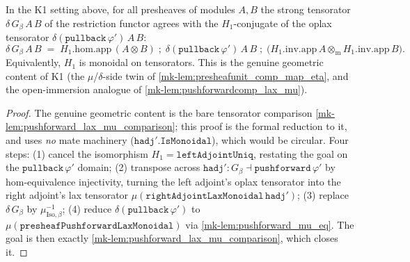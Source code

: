 \begin{lemma}\label{mk-lem:pushforward_mu_appiso_collapse}
  \leanok

  In the K1 setting above, for all presheaves of modules \(A, B\) the strong tensorator
  \(\delta\,G_\beta\,A\,B\) of the restriction functor agrees with the \(H_1\)-conjugate of the
  oplax tensorator \(\delta(\mathtt{pullback}\,\varphi')\,A\,B\):
  \[
    \delta\,G_\beta\,A\,B
    \;=\;
    H_1.\mathrm{hom}.\mathrm{app}\,(A \otimes B)
    \;\mathbin{;}\;
    \delta(\mathtt{pullback}\,\varphi')\,A\,B
    \;\mathbin{;}\;
    \bigl(H_1.\mathrm{inv}.\mathrm{app}\,A \otimes_{\mathrm m} H_1.\mathrm{inv}.\mathrm{app}\,B\bigr).
  \]
  Equivalently, \(H_1\) is monoidal on tensorators. This is the genuine geometric content of K1
  (the $\mu$/$\delta$-side twin of \ref{mk-lem:presheafunit_comp_map_eta}, and the open-immersion
  analogue of \ref{mk-lem:pushforwardcomp_lax_mu}).
\end{lemma}
\begin{proof}
  \leanok
  The genuine geometric content is the bare tensorator comparison
  \ref{mk-lem:pushforward_lax_mu_comparison}; this proof is the formal reduction to it, and uses
  \emph{no} mate machinery (\(\mathtt{hadj}'.\mathtt{IsMonoidal}\)), which would be circular. Four
  steps: (1) cancel the isomorphism \(H_1 = \mathtt{leftAdjointUniq}\), restating the goal on the
  \(\mathtt{pullback}\,\varphi'\) domain; (2) transpose across
  \(\mathtt{hadj}' : G_\beta \dashv \mathtt{pushforward}\,\varphi'\) by hom-equivalence
  injectivity, turning the left adjoint's oplax tensorator into the right adjoint's lax tensorator
  \(\mu(\mathtt{rightAdjointLaxMonoidal}\,\mathtt{hadj}')\); (3) replace \(\delta\,G_\beta\) by
  \(\mu_{\mathrm{Iso},\beta}^{-1}\); (4) reduce
  \(\delta(\mathtt{pullback}\,\varphi')\) to \(\mu(\mathtt{presheafPushforwardLaxMonoidal})\) via
  \ref{mk-lem:pushforward_mu_eq}. The goal is then exactly
  \ref{mk-lem:pushforward_lax_mu_comparison}, which closes it.
\end{proof}

